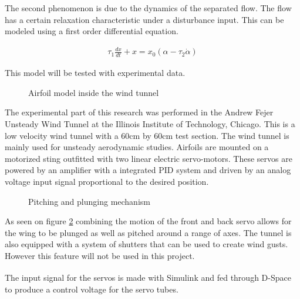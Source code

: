 \par The second phenomenon is due to the dynamics of the separated flow.
The flow has a certain relaxation characteristic under a disturbance input.
This can be modeled using a first order differential equation.

\begin{eqnarray}
  \tau_1 \frac{dx}{dt} +x = x_0(\alpha - \tau_2 \dot{\alpha}) 
  \label{eqn:state_variable}
\end{eqnarray}

This model will be tested with experimental data.



\begin{figure}[h]
  \begin{center}
  \end{center}
  \caption{Airfoil model inside the wind tunnel}
  \label{fig:wind_tunnel}
\end{figure}

The experimental part of this research was performed in the Andrew Fejer Unsteady Wind Tunnel at the Illinois Institute of Technology, Chicago.
This is a low velocity wind tunnel with a 60cm by 60cm test section.
The wind tunnel is mainly used for unsteady aerodynamic studies.
Airfoils are mounted on a motorized sting outfitted with two linear electric servo-motors.
These servos are powered by an amplifier with a integrated PID system and driven by an analog voltage input signal proportional to the desired position.

\begin{figure}[h]
  \begin{center}
  \end{center}
  \caption{Pitching and plunging mechanism}
  \label{fig:pitching_mechanism}
\end{figure}

As seen on figure \ref{fig:pitching_mechanism} combining the motion of the front and back servo allows for the wing to be plunged as well as pitched around a range of axes.
The tunnel is also equipped with a system of shutters that can be used to create wind gusts.
However this feature will not be used in this project.

\par The input signal for the servos is made with Simulink\textsuperscript{\textregistered} and fed through D-Space\textsuperscript{\textregistered} to produce a control voltage for the servo tubes. 

